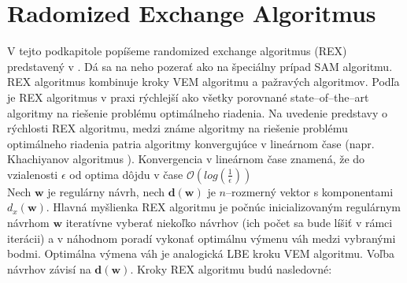 \section {Radomized Exchange Algoritmus}

V tejto podkapitole popíšeme randomized exchange algoritmus (REX) predstavený v \cite{rex_harman}. Dá sa na neho pozerať ako na špeciálny prípad SAM algoritmu. REX algoritmus kombinuje kroky VEM algoritmu a pažravých algoritmov. Podľa \cite{rex_harman} je REX algoritmus v praxi rýchlejší ako všetky porovnané state--of--the--art algoritmy na riešenie problému optimálneho riadenia. Na uvedenie predstavy o rýchlosti REX algoritmu, medzi známe algoritmy na riešenie problému optimálneho riadenia patria algoritmy konvergujúce v lineárnom čase (napr. Khachiyanov algoritmus \cite{complexity_khachiyan}). Konvergencia v lineárnom čase znamená, že do vzialenosti $\epsilon$ od optima dôjdu v čase $\mathcal{O}(log(\frac{1}{\epsilon}))$ \\

Nech $\mathbf w$ je regulárny návrh, nech $\mathbf {d(w)}$ je $n$--rozmerný vektor s komponentami $d_x(\mathbf w)$. Hlavná myšlienka REX algoritmu je počnúc inicializovaným regulárnym návrhom $\mathbf w$ iteratívne vyberať niekoľko návrhov (ich počet sa bude líšiť v rámci iterácii) a v náhodnom poradí vykonať optimálnu výmenu váh medzi vybranými bodmi. Optimálna výmena váh je analogická LBE kroku VEM algoritmu. Voľba návrhov závisí na $\mathbf{d(w)}$. Kroky REX algoritmu budú nasledovné:


